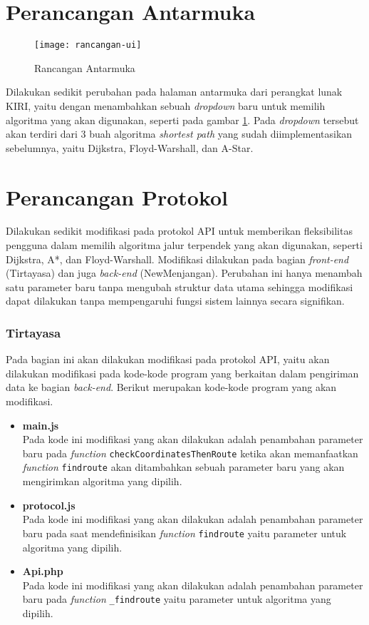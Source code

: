 \section{Perancangan Antarmuka}
\label{sec:rancanganui}

\begin{figure}[H]
    \centering
    \texttt{[image: rancangan-ui]}
    \caption{Rancangan Antarmuka}
    \label{fig:rancanganui}
\end{figure}

\noindent
Dilakukan sedikit perubahan pada halaman antarmuka dari perangkat lunak KIRI, yaitu dengan menambahkan sebuah \textit{dropdown} baru untuk memilih algoritma yang akan digunakan, seperti pada gambar \ref{fig:rancanganui}. Pada \textit{dropdown} tersebut akan terdiri dari 3 buah algoritma \textit{shortest path} yang sudah diimplementasikan sebelumnya, yaitu Dijkstra, Floyd-Warshall, dan A-Star. 
\newpage
\section{Perancangan Protokol}
Dilakukan sedikit modifikasi pada protokol API untuk memberikan fleksibilitas pengguna dalam memilih algoritma jalur terpendek yang akan digunakan, seperti Dijkstra, A*, dan Floyd-Warshall. Modifikasi dilakukan pada bagian \textit{front-end} (Tirtayasa) dan juga \textit{back-end} (NewMenjangan). Perubahan ini hanya menambah satu parameter baru tanpa mengubah struktur data utama sehingga modifikasi dapat dilakukan tanpa mempengaruhi fungsi sistem lainnya secara signifikan.

\subsubsection{Tirtayasa}
Pada bagian ini akan dilakukan modifikasi pada protokol API, yaitu akan dilakukan modifikasi pada kode-kode program yang berkaitan dalam pengiriman data ke bagian \textit{back-end}. Berikut merupakan kode-kode program yang akan modifikasi.
\begin{itemize}
    \item \textbf{main.js}
    \\ Pada kode ini modifikasi yang akan dilakukan adalah penambahan parameter baru pada \textit{function} \texttt{checkCoordinatesThenRoute} ketika akan memanfaatkan \textit{function} \texttt{findroute} akan ditambahkan sebuah parameter baru yang akan mengirimkan algoritma yang dipilih.

    \item \textbf{protocol.js}
    \\ Pada kode ini modifikasi yang akan dilakukan adalah penambahan parameter baru pada saat mendefinisikan \textit{function} \texttt{findroute} yaitu parameter untuk algoritma yang dipilih.

    \item \textbf{Api.php}
    \\ Pada kode ini modifikasi yang akan dilakukan adalah penambahan parameter baru pada \textit{function} \texttt{\_findroute} yaitu parameter untuk algoritma yang dipilih.
\end{itemize}

